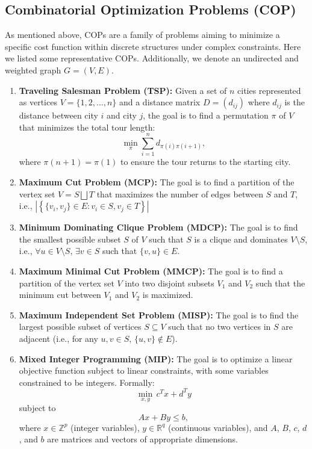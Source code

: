 \documentclass[a4paper]{article}
\begin{document}
\subsection{Combinatorial Optimization Problems (COP)}
As mentioned above, COPs are a family of problems aiming to minimize a specific cost function within discrete structures under complex constraints. Here we listed some representative COPs. Additionally, we denote an undirected and weighted graph \( G = (V, E) \).
\begin{enumerate}
\item {\textbf{Traveling Salesman Problem (TSP):}} Given a set of \( n \) cities represented as vertices \( V = \{1, 2, \ldots, n\} \) and a distance matrix \( D = (d_{ij}) \) where \( d_{ij} \) is the distance between city \( i \) and city \( j \), the goal is to find a permutation \( \pi \) of \( V \) that minimizes the total tour length:
\[
\min_{\pi} \sum_{i=1}^{n} d_{\pi(i) \pi(i+1)},
\]
where \( \pi(n+1) = \pi(1) \) to ensure the tour returns to the starting city.
\item {\textbf{Maximum Cut Problem  (MCP):}} The goal is to find a partition of the vertex set \( V = S \bigsqcup T \) that maximizes the number of edges between \( S \) and \( T \), i.e., \( \left| \left\{ \{v_i, v_j\} \in E : v_i \in S, v_j \in T \right\} \right| \)
\item {\textbf{Minimum Dominating Clique Problem (MDCP):}} The goal is to find the smallest possible subset \( S \) of \( V \) such that \( S \) is a clique and dominates \( V \setminus S \), i.e., \( \forall u \in V \setminus S \), \( \exists v \in S \) such that \( \{v, u\} \in E \). 
\item {\textbf{Maximum Minimal Cut Problem (MMCP):}} The goal is to find a partition of the vertex set \( V \) into two disjoint subsets \( V_1 \) and \( V_2 \) such that the minimum cut between \( V_1 \) and \( V_2 \) is maximized.
\item{\textbf{Maximum Independent Set Problem (MISP):}} The goal is to find the largest possible subset of vertices \( S \subseteq V \) such that no two vertices in \( S \) are adjacent (i.e., for any \( u, v \in S \), \( \{u, v\} \notin E \)).
\item{\textbf{Mixed Integer Programming (MIP):}} The goal is to optimize a linear objective function subject to linear constraints, with some variables constrained to be integers. Formally:
\[
\min_{x, y} \, c^T x + d^T y
\]
subject to
\[
A x + B y \leq b,
\]
where \( x \in \mathbb{Z}^p \) (integer variables), \( y \in \mathbb{R}^q \) (continuous variables), and \( A \), \( B \), \( c \), \( d \), and \( b \) are matrices and vectors of appropriate dimensions.


\end{enumerate}
\end{document}
